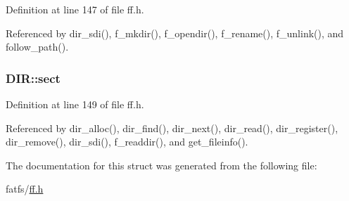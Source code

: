 Definition at line 147 of file ff.\-h.



Referenced by dir\-\_\-sdi(), f\-\_\-mkdir(), f\-\_\-opendir(), f\-\_\-rename(), f\-\_\-unlink(), and follow\-\_\-path().

\hypertarget{structDIR_ad01fcc812ed0dad11a593574336adc9e}{
\subsubsection[{sect}]{ D\-I\-R\-::sect}}\label{structDIR_ad01fcc812ed0dad11a593574336adc9e}


Definition at line 149 of file ff.\-h.



Referenced by dir\-\_\-alloc(), dir\-\_\-find(), dir\-\_\-next(), dir\-\_\-read(), dir\-\_\-register(), dir\-\_\-remove(), dir\-\_\-sdi(), f\-\_\-readdir(), and get\-\_\-fileinfo().



The documentation for this struct was generated from the following file\-:\begin{DoxyCompactItemize}
\item 
fatfs/\hyperlink{ff_8h}{ff.\-h}\end{DoxyCompactItemize}
